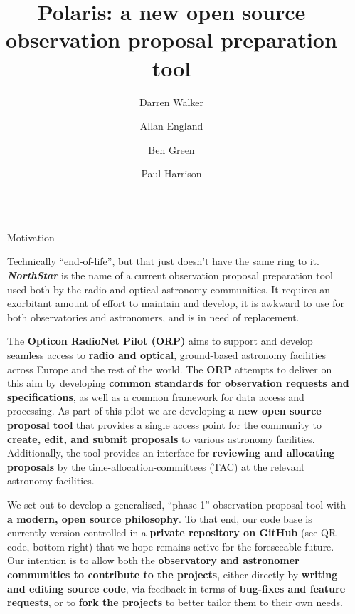\documentclass[final]{beamer}
\title{Polaris: a new open source observation proposal preparation tool}
\author{Darren Walker \and Allan England \and Ben Green \and Paul Harrison}
\institute[shortinst]{JBCA, The University of Manchester, UK}
\newlength{\sepwidth}
\newlength{\colwidth}
\newcommand{\separatorcolumn}{\begin{column}{\sepwidth}\end{column}}
\begin{document}
    \begin{frame}[t]
        \begin{columns}[t]
            \separatorcolumn

            \begin{column}{\colwidth}

                \begin{block}{Motivation}

                    Technically ``end-of-life'', but that just doesn't have the same ring to it.
                    \textbf{\emph{NorthStar}} is the name of a current observation proposal preparation tool used both
                    by the radio and optical astronomy communities.
                    It requires an exorbitant amount of effort to maintain and develop, it is awkward to use for both
                    observatories and astronomers, and is in need of replacement.

                    The \textbf{Opticon RadioNet Pilot (ORP)} aims to support and develop seamless access to
                    \textbf{radio and optical}, ground-based astronomy facilities across Europe and the rest of the
                    world.
                    The \textbf{ORP} attempts to deliver on this aim by developing \textbf{common standards for observation
                    requests and specifications}, as well as a common framework for data access and processing.
                    As part of this pilot we are developing \textbf{a new open source proposal tool} that provides a
                    single access point for the community to \textbf{create, edit, and submit proposals} to various
                    astronomy facilities.
                    Additionally, the tool provides an interface for \textbf{reviewing and allocating proposals} by the
                    time-allocation-committees (TAC) at the relevant astronomy facilities.

                    We set out to develop a generalised, ``phase 1'' observation proposal tool with
                    \textbf{a modern, open source philosophy}.
                    To that end, our code base is currently version controlled in a
                    \textbf{private repository on GitHub} (see QR-code, bottom right) that we hope remains active for
                    the foreseeable future.
                    Our intention is to allow both the
                    \textbf{observatory and astronomer communities to contribute to the projects},
                    either directly by \textbf{writing and editing source code}, via feedback in terms of
                    \textbf{bug-fixes and feature requests}, or to \textbf{fork the projects} to better tailor them to
                    their own needs.


\end{block}
\end{column}
\end{columns}
\end{frame}
\end{document}
